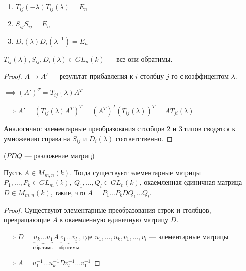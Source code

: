 \begin{follow}~

    \begin{enumerate}
        \item $T_{ij}(-\lambda) T_{ij}(\lambda) = E_n$
        
        \item $S_{ij} S_{ij} = E_n$
        
        \item $D_i(\lambda) D_i(\lambda^{-1}) = E_n$
    \end{enumerate}
\end{follow}

\begin{follow}
    $T_{ij}(\lambda), S_{ij}, D_i(\lambda) \in GL_n(k)$ --- все они обратимы.
\end{follow}

\begin{proof}
    
    $A \longrightarrow A'$ --- результат прибавления к $i$ столбцу $j$-го с коэффицентом $\lambda$.

    $\implies (A')^T = T_{ij}(\lambda) A^T$

    $\implies A' = (T_{ij}(\lambda) A^T)^T = (A^T)^T (T_{ij}(\lambda))^T = A T_{ji}(\lambda)$

    Аналогично: элементарные преобразования столбцов $2$ и $3$ типов сводятся к умножению справа на $S_{ij}$ и $D_i(\lambda)$ соответственно.
\end{proof}

\begin{theorem-non} ($PDQ$ --- разложение матриц)

    Пусть $A \in M_{m,n}(k)$. Тогда существуют элементарные матрицы $P_1, \ldots, P_k \in GL_m(k),~Q_1, \ldots, Q_l \in GL_n(k)$, окаемленная единичная матрица $D \in M_{m, n}(k)$, такие, что $A = P_1 \ldots P_k D Q_1 \ldots Q_l$.
\end{theorem-non}

\begin{proof}
    Существуют элементарные преобразования строк и столбцов, превращающие $A$ в окаемленную единичную матрицу $D$.

    $\implies D = \underbrace{u_k \ldots u_1}_{\text{обратимы}} A \underbrace{v_1 \ldots v_l}_{\text{обратимы}}$, где $u_1, \ldots, u_k, v_1, \ldots, v_l$ --- элементарные матрицы

    $\implies A = u_1^{-1} \ldots u_k^{-1} D v_l^{-1} \ldots v_1^{-1}$
\end{proof}

